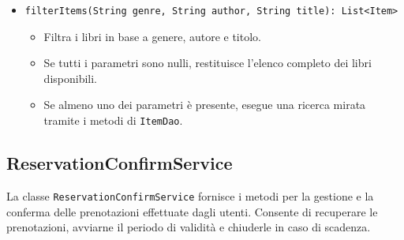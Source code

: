 \documentclass[twoside,openright,titlepage,fleqn,headinclude,12pt,a4paper,BCOR=5mm,footinclude]{scrbook}
\begin{document}
\begin{itemize}
    \item \texttt{filterItems(String genre, String author, String title): List<Item>}  
    \begin{itemize}  
        \item Filtra i libri in base a genere, autore e titolo.  
        \item Se tutti i parametri sono nulli, restituisce l’elenco completo dei libri disponibili.  
        \item Se almeno uno dei parametri è presente, esegue una ricerca mirata tramite i metodi di \texttt{ItemDao}.  
    \end{itemize}  
\end{itemize}  


\subsection{ReservationConfirmService}
La classe \texttt{ReservationConfirmService} fornisce i metodi per la gestione e la conferma delle prenotazioni effettuate dagli utenti. Consente di recuperare le prenotazioni, avviarne il periodo di validità e chiuderle in caso di scadenza.
\end{document}
